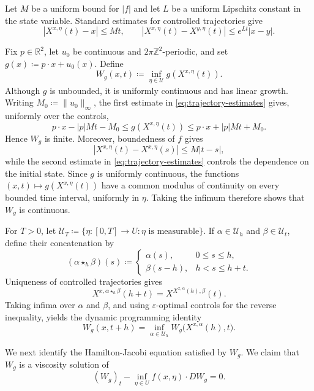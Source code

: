 \documentclass[11pt,reqno,noamsfonts]{amsart}
\theoremstyle{definition}
\theoremstyle{remark}
\begin{document}
Let $M$ be a uniform bound for $|f|$ and let $L$ be a uniform
Lipschitz constant in the state variable. Standard estimates for controlled trajectories
\cite[Chapter~III, Section~1]{BardiCapuzzoDolcetta1997}
give
\begin{equation}\label{eq:trajectory-estimates}
  |X^{x,\eta}(t)-x|\le Mt,
  \qquad
  |X^{x,\eta}(t)-X^{y,\eta}(t)|
  \le e^{Lt}|x-y|.
\end{equation}

Fix $p\in\mathbb R^2$, let $u_0$ be continuous and
$2\pi\mathbb Z^2$-periodic, and set
  $g(x)\coloneqq p\cdot x+u_0(x)$.
Define
\begin{equation*}
  W_g(x,t)
  \coloneqq
  \inf_{\eta\in\mathcal U}
  g(X^{x,\eta}(t)).
\end{equation*}
Although $g$ is unbounded, it is uniformly continuous and has linear
growth. Writing $M_0\coloneqq\|u_0\|_\infty$, the first estimate in
\eqref{eq:trajectory-estimates} gives, uniformly over the controls,
\[
  p\cdot x-|p|Mt-M_0
  \le g(X^{x,\eta}(t))
  \le p\cdot x+|p|Mt+M_0.
\]
Hence $W_g$ is finite. Moreover, boundedness of $f$ gives
\[
  |X^{x,\eta}(t)-X^{x,\eta}(s)|
  \le M|t-s|,
\]
while the second estimate in \eqref{eq:trajectory-estimates} controls
the dependence on the initial state. Since $g$ is uniformly continuous,
the functions
  $(x,t)\mapsto g(X^{x,\eta}(t))$
have a common modulus of continuity on every bounded time interval,
uniformly in $\eta$. Taking the infimum therefore shows that $W_g$ is
continuous.

For $T>0$, let
  $\mathcal U_T
  \coloneqq 
  \{\eta:[0,T]\to U:\eta\text{ is measurable}\}$.
If $\alpha\in\mathcal U_h$ and $\beta\in\mathcal U_t$, define their
concatenation by
\[
  (\alpha\star_h\beta)(s)
  \coloneqq 
  \begin{cases}
    \alpha(s),&0\le s\le h,\\
    \beta(s-h),&h<s\le h+t.
  \end{cases}
\]
Uniqueness of controlled trajectories gives
\[
  X^{x,\alpha\star_h\beta}(h+t)
  =
  X^{ X^{x,\alpha}(h),\beta}(t).
\]
Taking infima over $\alpha$ and $\beta$, and using
$\varepsilon$-optimal controls for the reverse inequality, yields the
dynamic programming identity \cite[Chapter~III, Section~3.1]{BardiCapuzzoDolcetta1997}
\begin{equation}\label{eq:DPP-app}
  W_g(x,t+h)
  =
  \inf_{\alpha\in\mathcal U_h}
  W_g\bigl(X^{x,\alpha}(h),t\bigr).
\end{equation}

We next identify the Hamilton-Jacobi equation satisfied by $W_g$.
We claim that $W_g$ is a viscosity solution of
\begin{equation}\label{eq:HJB-control-app}
  (W_g)_t
  -
  \inf_{\eta\in U}
  f(x,\eta)\cdot D W_g
  =0.
\end{equation}
\end{document}
